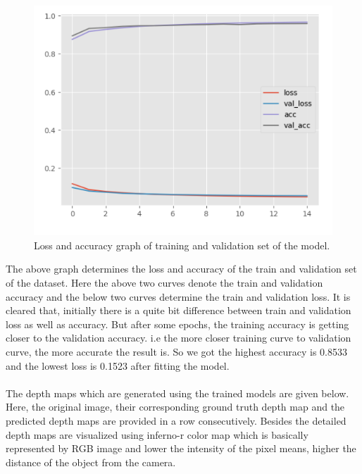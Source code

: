 \documentclass[a4paper,12pt,oneside]{book}
\begin{document}
\begin{figure}[!hbtp]
\centering
\includegraphics[width=.7\textwidth]{Figures/accuracy_graph.png}
\captionsetup{font=small}
\caption{Loss and accuracy graph of training and validation set of the model.}
\label{fig:ind}
\end{figure}
The above graph determines the loss and accuracy of the train and validation set of the dataset. Here the above two curves denote the train and validation accuracy and the below two curves determine the train and validation loss. It is cleared that, initially there is a quite bit difference between train and validation loss as well as accuracy. But after some epochs, the training accuracy is getting closer to the validation accuracy. i.e the more closer training curve to validation curve, the more accurate the result is. So we got the highest accuracy is 0.8533 and the lowest loss is 0.1523 after fitting the model.\\\\
The depth maps which are generated using the trained models are given below. Here, the original image, their corresponding  ground truth depth map and the predicted depth maps are provided in a row consecutively.
Besides the detailed depth maps are visualized using inferno-r color map which is basically represented by RGB image and lower the intensity of the pixel means, higher the distance of the object from the camera.\\
\end{document}

